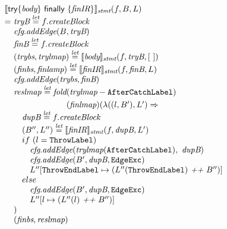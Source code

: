 \[
\begin{array}{l@{}l@{~}l}
\lefteqn{\transfun{\ircfgtryfin{\emph{body}}{\emph{finIR}}}_{\emph{stmt}}(f, B, L)}\\
& = & \emph{tryB} \letval f.\emph{createBlock}\\
& & \emph{cfg}.\emph{addEdge}(B, \emph{tryB})\\
& & \emph{finB} \letval f.\emph{createBlock}\\
& & (\emph{trybs}, \emph{trylmap}) \letval \transfun{\emph{body}}_{\emph{stmt}}(f, \emph{tryB}, [\ ])\\
& & (\emph{finbs}, \emph{finlamp}) \letval \transfun{\emph{finIR}}_{\emph{stmt}}(f, \emph{finB}, L)\\
& & \emph{cfg}.\emph{addEdge}(\emph{trybs}, \emph{finB})\\
& & \emph{reslmap} \letval \fold(\emph{trylmap} - \AfterCatchLabel)\\
& & \phantom{\emph{reslmap} \letval \fold}(\emph{finlmap})
(\lambda((l, B'), L') \Rightarrow \\
& & \quad \emph{dupB} \letval f.\emph{createBlock}\\
& & \quad (B'', L'') \letval \transfun{\emph{finIR}}_{\emph{stmt}}(f, \emph{dupB}, L')\\
& & \quad if\ (l = \ThrowLabel)\\
& & \quad \phantom{if} \emph{cfg}.\emph{addEdge}(\emph{trylmap}(\AfterCatchLabel),\ \emph{dupB})\\
& & \quad \phantom{if} \emph{cfg}.\emph{addEdge}(B', \emph{dupB}, \EdgeExc)\\
& & \quad \phantom{if} L''[\ThrowEndLabel \mapsto (L''(\ThrowEndLabel) ~\emph{++}~ B'')]
~~~~~~~~~~~~~~~~\\
& & \quad else\\
& & \quad \phantom{if} \emph{cfg}.\emph{addEdge}(B', \emph{dupB}, \EdgeExc)\\
& & \quad \phantom{if} L''[l \mapsto (L''(l) ~\emph{++}~ B'')]\\
& & )\\
& & (\emph{finbs}, \emph{reslmap})\\
& & \\


\end{array}\]
